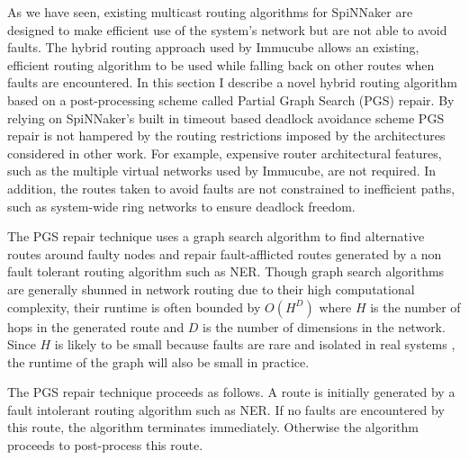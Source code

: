 		As we have seen, existing multicast routing algorithms for SpiNNaker are
		designed to make efficient use of the system's network but are not able to
		avoid faults. The hybrid routing approach used by Immucube allows an
		existing, efficient routing algorithm to be used while falling back on
		other routes when faults are encountered.  In this section I describe a
		novel hybrid routing algorithm based on a post-processing scheme called
		Partial Graph Search (PGS) repair.  By relying on SpiNNaker's built in
		timeout based deadlock avoidance scheme PGS repair is not hampered by the
		routing restrictions imposed by the architectures considered in other work.
		For example, expensive router architectural features, such as the multiple
		virtual networks used by Immucube, are not required. In addition, the
		routes taken to avoid faults are not constrained to inefficient paths, such
		as system-wide ring networks to ensure deadlock freedom.
		
		The PGS repair technique uses a graph search algorithm to find alternative
		routes around faulty nodes and repair fault-afflicted routes generated by a
		non fault tolerant routing algorithm such as NER. Though graph search
		algorithms are generally shunned in network routing due to their high
		computational complexity, their runtime is often bounded by $O(H^D)$ where
		$H$ is the number of hops in the generated route and $D$ is the number of
		dimensions in the network.  Since $H$ is likely to be small because faults
		are rare and isolated in real systems \cite{gara05,alverson12}, the runtime
		of the graph will also be small in practice.
		
		The PGS repair technique proceeds as follows. A route is initially
		generated by a fault intolerant routing algorithm such as NER. If no faults
		are encountered by this route, the algorithm terminates immediately.
		Otherwise the algorithm proceeds to post-process this route.
		
